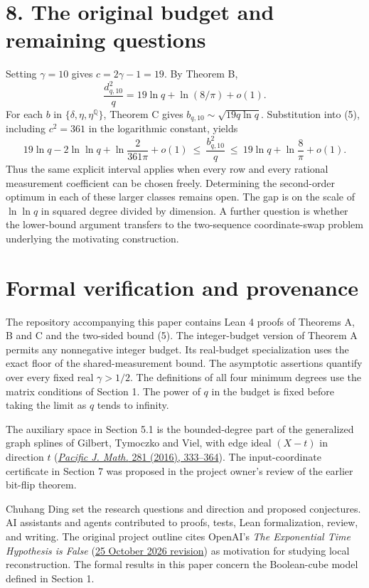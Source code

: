 \documentclass[
  10pt,
]{article}
\begin{document}
\section{8. The original budget and remaining questions}
Setting \(\gamma=10\) gives \(c=2\gamma-1=19\). By Theorem B,
\[
 \frac{d_{q,10}^2}{q}=19\ln q+\ln(8/\pi)+o(1).
\]
For each \(b\) in \(\{\delta,\eta,\eta^{\mathbb Q}\}\), Theorem C gives
\(b_{q,10}\sim\sqrt{19q\ln q}\). Substitution into (5), including
\(c^2=361\) in the logarithmic constant, yields
\[
 19\ln q-2\ln\ln q+\ln\frac{2}{361\pi}+o(1)
 \ \le\ \frac{b_{q,10}^2}{q}
 \ \le\ 19\ln q+\ln\frac8\pi+o(1).
\]
Thus the same explicit interval applies when every row and every rational
measurement coefficient can be chosen freely. Determining the second-order
optimum in each of these larger classes remains open. The gap is on the
scale of \(\ln\ln q\) in squared degree divided by dimension. A further
question is whether the lower-bound argument transfers to the two-sequence
coordinate-swap problem underlying the motivating construction.

\section*{Formal verification and provenance}
The repository accompanying this paper contains Lean 4 proofs of Theorems A, B and C and the two-sided bound (5). The integer-budget version of Theorem A permits any nonnegative integer budget. Its real-budget specialization uses the exact floor of the shared-measurement bound. The asymptotic assertions quantify over every fixed real \(\gamma>1/2\).
The definitions of all four minimum degrees use the matrix conditions of Section 1.
The power of \(q\) in the budget is fixed before taking the limit as \(q\) tends to infinity.

The auxiliary space in Section 5.1 is the bounded-degree part of the generalized graph splines of Gilbert, Tymoczko and Viel, with edge ideal \((X-t)\) in direction \(t\) (\href{https://doi.org/10.2140/pjm.2016.281.333}{\emph{Pacific J. Math.} 281 (2016), 333--364}). The input-coordinate certificate in Section 7 was proposed in the project owner's review of the earlier bit-flip theorem.

Chuhang Ding set the research questions and direction and proposed conjectures. AI assistants and agents contributed to proofs, tests, Lean formalization, review, and writing. The original project outline cites OpenAI's \emph{The Exponential Time Hypothesis is False} (\href{https://github.com/openai/math/tree/main/preprints/The-Exponential-Time-Hypothesis-is-False-October-25-2026}{25 October 2026 revision}) as motivation for studying local reconstruction. The formal results in this paper concern the Boolean-cube model defined in Section 1.
\end{document}
